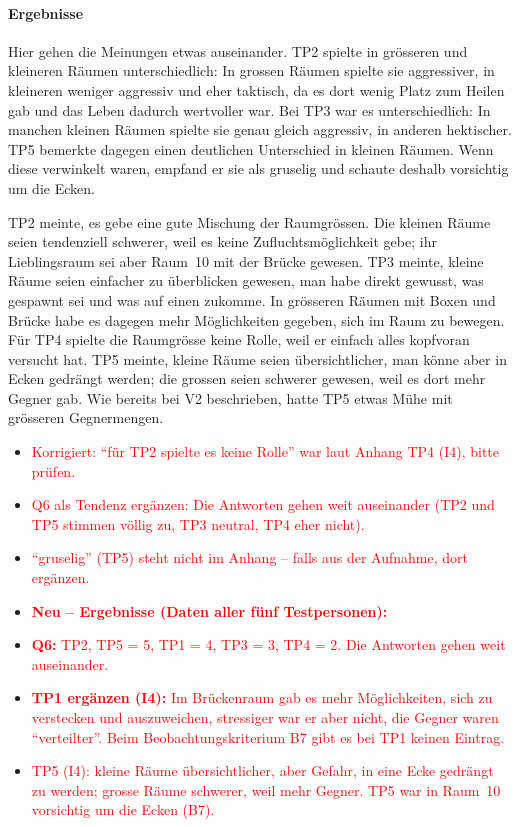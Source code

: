 \documentclass[../Main.tex]{subfiles}
\begin{document}
\paragraph{Ergebnisse}
Hier gehen die Meinungen etwas auseinander. TP2 spielte in grösseren und kleineren Räumen unterschiedlich: In grossen Räumen spielte sie aggressiver, in kleineren weniger aggressiv und eher taktisch, da es dort wenig Platz zum Heilen gab und das Leben dadurch wertvoller war. Bei TP3 war es unterschiedlich: In manchen kleinen Räumen spielte sie genau gleich aggressiv, in anderen hektischer. TP5 bemerkte dagegen einen deutlichen Unterschied in kleinen Räumen. Wenn diese verwinkelt waren, empfand er sie als gruselig und schaute deshalb vorsichtig um die Ecken.

TP2 meinte, es gebe eine gute Mischung der Raumgrössen. Die kleinen Räume seien tendenziell schwerer, weil es keine Zufluchtsmöglichkeit gebe; ihr Lieblingsraum sei aber Raum~10 mit der Brücke gewesen. TP3 meinte, kleine Räume seien einfacher zu überblicken gewesen, man habe direkt gewusst, was gespawnt sei und was auf einen zukomme. In grösseren Räumen mit Boxen und Brücke habe es dagegen mehr Möglichkeiten gegeben, sich im Raum zu bewegen. Für TP4 spielte die Raumgrösse keine Rolle, weil er einfach alles kopfvoran versucht hat. TP5 meinte, kleine Räume seien übersichtlicher, man könne aber in Ecken gedrängt werden; die grossen seien schwerer gewesen, weil es dort mehr Gegner gab. Wie bereits bei V2 beschrieben, hatte TP5 etwas Mühe mit grösseren Gegnermengen.

\begin{itemize}[leftmargin=1.5cm]
    \item \textcolor{red}{Korrigiert: \enquote{für TP2 spielte es keine Rolle} war laut Anhang TP4 (I4), bitte prüfen.}
    \item \textcolor{red}{Q6 als Tendenz ergänzen: Die Antworten gehen weit auseinander (TP2 und TP5 stimmen völlig zu, TP3 neutral, TP4 eher nicht).}
    \item \textcolor{red}{\enquote{gruselig} (TP5) steht nicht im Anhang -- falls aus der Aufnahme, dort ergänzen.}
\end{itemize}

\begin{itemize}[leftmargin=1.5cm]
    \item \textcolor{red}{\textbf{Neu -- Ergebnisse (Daten aller fünf Testpersonen):}}
    \item \textcolor{red}{\textbf{Q6:} TP2, TP5 = 5, TP1 = 4, TP3 = 3, TP4 = 2. Die Antworten gehen weit auseinander.}
    \item \textcolor{red}{\textbf{TP1 ergänzen (I4):} Im Brückenraum gab es mehr Möglichkeiten, sich zu verstecken und auszuweichen, stressiger war er aber nicht, die Gegner waren \enquote{verteilter}. Beim Beobachtungskriterium B7 gibt es bei TP1 keinen Eintrag.}
    \item \textcolor{red}{TP5 (I4): kleine Räume übersichtlicher, aber Gefahr, in eine Ecke gedrängt zu werden; grosse Räume schwerer, weil mehr Gegner. TP5 war in Raum~10 vorsichtig um die Ecken (B7).}
\end{itemize}
\end{document}
